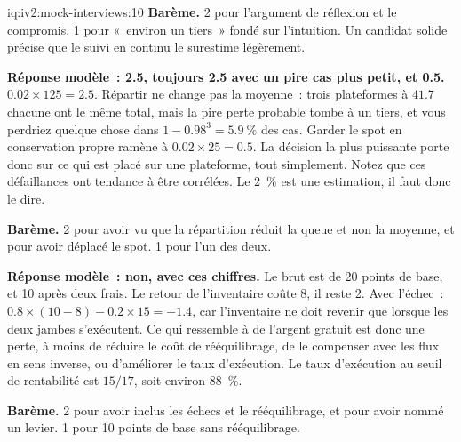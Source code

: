 \begin{solution}{iq:iv2:mock-interviews:10}
\textbf{Barème.} 2 pour l'argument de réflexion et le compromis. 1 pour «~environ un tiers~» fondé sur l'intuition. Un candidat solide précise que le suivi en continu le surestime légèrement.

\ivstop
\textbf{Réponse modèle~: 2.5, toujours 2.5 avec un pire cas plus petit, et 0.5.} $0.02 \times 125 = 2.5$. Répartir ne change pas la moyenne~: trois plateformes à $41.7$ chacune ont le même total, mais la pire perte probable tombe à un tiers, et vous perdriez quelque chose dans $1 - 0.98^3 = 5.9~\%$ des cas. Garder le spot en conservation propre ramène à $0.02 \times 25 = 0.5$. La décision la plus puissante porte donc sur ce qui est placé sur une plateforme, tout simplement. Notez que ces défaillances ont tendance à être corrélées. Le 2~\% est une estimation, il faut donc le dire.

\textbf{Barème.} 2 pour avoir vu que la répartition réduit la queue et non la moyenne, et pour avoir déplacé le spot. 1 pour l'un des deux.

\ivstop
\textbf{Réponse modèle~: non, avec ces chiffres.} Le brut est de 20 points de base, et 10 après deux frais. Le retour de l'inventaire coûte 8, il reste 2. Avec l'échec~: $0.8 \times (10 - 8) - 0.2 \times 15 = -1.4$, car l'inventaire ne doit revenir que lorsque les deux jambes s'exécutent. Ce qui ressemble à de l'argent gratuit est donc une perte, à moins de réduire le coût de rééquilibrage, de le compenser avec les flux en sens inverse, ou d'améliorer le taux d'exécution. Le taux d'exécution au seuil de rentabilité est $15/17$, soit environ 88~\%.

\textbf{Barème.} 2 pour avoir inclus les échecs et le rééquilibrage, et pour avoir nommé un levier. 1 pour 10 points de base sans rééquilibrage.


\end{solution}
